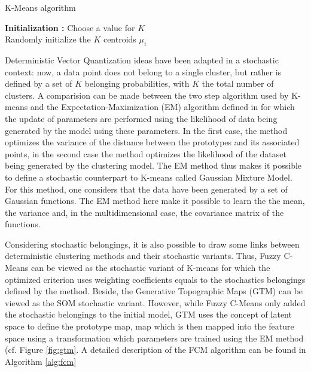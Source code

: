 \documentclass[a4paper]{report}
\begin{document}
    \begin{algorithm}
        \caption{K-Means algorithm}
        \label{alg:kmeans}
        \textbf{Initialization :} Choose a value for $K$\\
        Randomly initialize the $K$ centroids $\mu_i$\\
    \end{algorithm}

    Deterministic Vector Quantization ideas have been adapted in a stochastic context: now, a data point does not belong to a single cluster, but rather is defined by a set of $K$ belonging probabilities, with $K$ the total number of clusters. A comparision can be made between the two step algorithm used by K-means and the Expectation-Maximization (EM) algorithm defined in \cite{dempster1977maximum} for which the update of parameters are performed using the likelihood of data being generated by the model using these parameters. In the first case, the method optimizes the variance of the distance between the prototypes and its associated points, in the second case the method optimizes the likelihood of the dataset being generated by the clustering model. The EM method thus makes it possible to define a stochastic counterpart to K-means called Gaussian Mixture Model. For this method, one considers that the data have been generated by a set of Gaussian functions. The EM method here make it possible to learn the the mean, the variance and, in the multidimensional case, the covariance matrix of the functions.
    
    Considering stochastic belongings, it is also possible to draw some links between deterministic clustering methods and their stochastic variants. Thus, Fuzzy C-Means \cite{bezdek1984fcm} can be viewed as the stochastic variant of K-means for which the optimized criterion uses weighting coefficients equals to the stochastics belongings defined by the method. Beside, the Generative Topographic Maps (GTM) \cite{bishop1998gtm} can be viewed as the SOM stochastic variant. However, while Fuzzy C-Means only added the stochastic belongings to the initial model, GTM uses the concept of latent space to define the prototype map, map which is then mapped into the feature space using a transformation which parameters are trained using the EM method (cf. Figure \ref{fig:gtm}. A detailed description of the FCM algorithm can be found in Algorithm \ref{alg:fcm}
\end{document}
